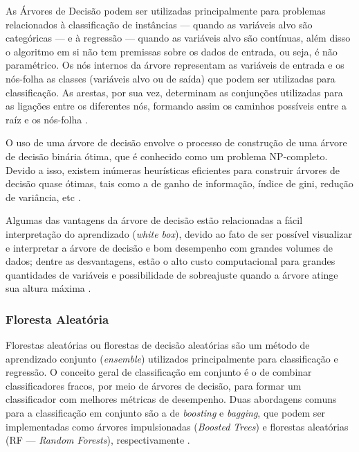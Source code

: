 \documentclass[
	12pt,				%
	oneside,			%
	a4paper,			%
	english,			%
	brazil				%
	]{abntex2ppgsi}
\begin{document}
{As Árvores de Decisão podem ser utilizadas principalmente para problemas relacionados à classificação de instâncias --- quando as variáveis alvo são categóricas --- e à regressão --- quando as variáveis alvo são contínuas, além disso o algoritmo em si não tem premissas sobre os dados de entrada, ou seja, é não paramétrico. Os nós internos da árvore representam as variáveis de entrada e os nós-folha as classes (variáveis alvo ou de saída) que podem ser utilizadas para classificação. As arestas, por sua vez, determinam as conjunções utilizadas para as ligações entre os diferentes nós, formando assim os caminhos possíveis entre a raíz e os nós-folha \cite{kotsiantis2007supervised}.

O uso de uma árvore de decisão envolve o processo de construção de uma árvore de decisão binária ótima, que é conhecido como um problema NP-completo. Devido a isso, existem inúmeras heurísticas eficientes para construir árvores de decisão quase ótimas, tais como a de ganho de informação, índice de gini, redução de variância, etc \cite{kotsiantis2007supervised}. 

Algumas das vantagens da árvore de decisão estão relacionadas a fácil interpretação do aprendizado (\textit{white box}), devido ao fato de ser possível visualizar e interpretar a árvore de decisão e bom desempenho com grandes volumes de dados; dentre as desvantagens, estão o alto custo computacional para grandes quantidades de variáveis e possibilidade de sobreajuste quando a árvore atinge sua altura máxima \cite{kotsiantis2007supervised, dwivedi2016automatic}.

\subsubsection{Floresta Aleatória}

Florestas aleatórias ou florestas de decisão aleatórias são um método de aprendizado conjunto (\textit{ensemble}) utilizados principalmente  para classificação e regressão. O conceito geral de classificação em conjunto é o de combinar classificadores fracos, por meio de árvores de decisão, para formar um classificador com melhores métricas de desempenho. Duas abordagens comuns para a classificação em conjunto são a de \textit{boosting} e \textit{bagging}, que podem ser implementadas como árvores impulsionadas (\textit{Boosted Trees}) e florestas aleatórias (RF --- \textit{Random Forests}), respectivamente \cite{mcdonald2014steering}.

}
\end{document}
